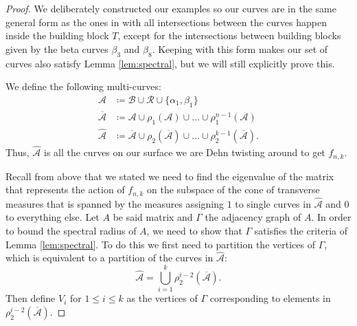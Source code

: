 \begin{proof}
 We deliberately constructed our examples so our curves are in the same general form as the ones in
 \cite{yazdi2018pseudo} with all intersections between the curves happen inside the building block $T$, except for the intersections between building blocks given by the beta curves $\beta_3$ and $\beta_8$. Keeping with this form makes our set of curves also satisfy Lemma \ref{lem:spectral}, but we will still explicitly prove this.

  We define the following multi-curves:
\begin{align*}
  \mathcal{A} &\coloneqq \mathcal{B} \cup \mathcal{R} \cup \{\alpha_1,\beta_1\} \\
  \overline{\mathcal{A}} &\coloneqq \mathcal{A} \cup \rho_1(\mathcal{A}) \cup \dots \cup \rho_1^{n-1}(\mathcal{A}) \\
  \widehat{\mathcal{A}} &\coloneqq \overline{\mathcal{A}} \cup \rho_2\left(\overline{\mathcal{A}}\right) \cup \dots \cup \rho_2^{k-1}\left(\overline{\mathcal{A}}\right).
\end{align*}
Thus, $\hat{\mathcal{A}}$ is all the curves on our surface we are Dehn twisting around to get $f_{n,k}$.

Recall from above that we stated we need to find the eigenvalue of the matrix that represents the action of
$f_{n,k}$ on the subspace of the cone of transverse measures that is spanned by the measures assigning $1$ to
single curves in $\hat{\mathcal{A}}$ and 0 to everything else. Let $A$ be said matrix and $\Gamma$ the
adjacency graph of $A$. In order to bound the spectral radius of $A$, we need to show that $\Gamma$ satisfies
the criteria of Lemma \ref{lem:spectral}. To do this we first need to partition the vertices of $\Gamma$, which is equivalent
to a partition of the curves in $\hat{\mathcal{A}}$:
$$\hat{\mathcal{A}} = \bigcup_{i=1}^k \rho_2^{i-2}(\overline{\mathcal{A}}).$$ Then define $V_i$ for
$1 \leq i \leq k$ as the vertices of $\Gamma$ corresponding to elements in
$\rho_2^{i-2}(\overline{\mathcal{A}})$.


\end{proof}

